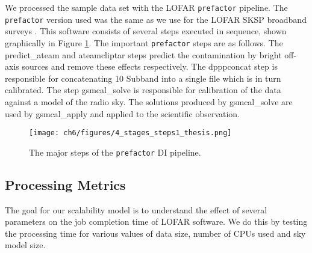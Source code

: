 We processed the sample data set with the LOFAR \texttt{prefactor} pipeline. The \texttt{prefactor} version used was the same as we use for the LOFAR SKSP broadband surveys \citep{prefactor_LOTSS_DR1}. This software consists of several steps executed in sequence, shown graphically in Figure \ref{fig:ch6_prefactor_steps}. The important \texttt{prefactor} steps are as follows. The {\selectfont predict\_ateam} and {\selectfont ateamcliptar} steps predict the contamination by bright off-axis sources and remove these effects respectively. The {\selectfont dpppconcat} step is responsible for concatenating 10 Subband into a single file which is in turn calibrated. The step {\selectfont gsmcal\_solve} is responsible for calibration of the data against a model of the radio sky. The solutions produced by {\selectfont gsmcal\_solve} are used by {\selectfont gsmcal\_apply} and applied to the scientific observation.

\begin{figure}
    \texttt{[image: ch6/figures/4\_stages\_steps1\_thesis.png]}
      \caption{The major steps of the \texttt{prefactor} DI pipeline. }
	\label{fig:ch6_prefactor_steps}
\end{figure}

\subsection{Processing Metrics}
The goal for our scalability model is to understand the effect of several parameters on the job completion time of LOFAR software. We do this by testing the processing time for various values of data size, number of CPUs used and sky model size. 
 

